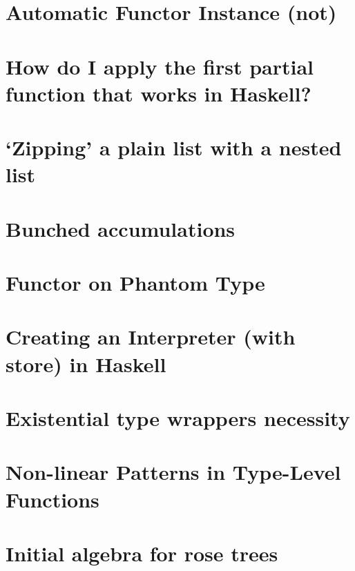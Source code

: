 \documentclass{book}%
\begin{document}
\section{Automatic Functor Instance (not)}


\section{How do I apply the first partial function that works in Haskell?}


\section{`Zipping' a plain list with a nested list}


\section{Bunched accumulations}


\section{Functor on Phantom Type}


\section{Creating an Interpreter (with store) in Haskell}


\section{Existential type wrappers necessity}


\section{Non-linear Patterns in Type-Level Functions}


\section{Initial algebra for rose trees}


\end{document}
